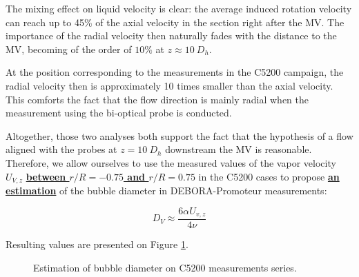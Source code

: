 \npar

The mixing effect on liquid velocity is clear: the average induced rotation velocity can reach up to 45\% of the axial velocity in the section right after the MV. The importance of the radial velocity then naturally fades with the distance to the MV, becoming of the order of $10\%$ at $z\approx 10\ D_{h}$. 

\npar

At the position corresponding to the measurements in the C5200 campaign, the radial velocity then is approximately 10 times smaller than the axial velocity. This comforts the fact that the flow direction is mainly radial when the measurement using the bi-optical probe is conducted.

\npar

Altogether, those two analyses both support the fact that the hypothesis of a flow aligned with the probes at $z=10\ D_{h}$ downstream the MV is reasonable. Therefore, we allow ourselves to use the measured values of the vapor velocity $U_{V,z}$ \textbf{\underline{between $r/R=-0.75$ and $r/R=0.75$}} in the C5200 cases to propose \textbf{\underline{an estimation}} of the bubble diameter in DEBORA-Promoteur measurements:

\begin{equation}
D_{V} \approx \frac{6 \alpha U_{v,z}}{4\nu}
\end{equation}


Resulting values are presented on Figure \ref{fig:exp_C52_dvap}.

\begin{figure}[!h]
\centering
{}

\caption{Estimation of bubble diameter on C5200 measurements series.}
\label{fig:exp_C52_dvap}
\end{figure}

